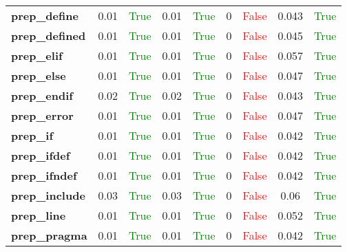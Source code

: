 \documentclass{article}
\begin{document}
\begin{xltabular}{\textwidth}{lcccccccc}
\textbf{{\fontsize{10}{12}\selectfont prep\_define}}& 0.01&\textcolor{green}{True}& 0.01&\textcolor{green}{True}& 0&\textcolor{red}{False}& 0.043&\textcolor{green}{True} \\[0.5ex]
\textbf{{\fontsize{10}{12}\selectfont prep\_defined}}& 0.01&\textcolor{green}{True}& 0.01&\textcolor{green}{True}& 0&\textcolor{red}{False}& 0.045&\textcolor{green}{True} \\[0.5ex]
\textbf{{\fontsize{10}{12}\selectfont prep\_elif}}& 0.01&\textcolor{green}{True}& 0.01&\textcolor{green}{True}& 0&\textcolor{red}{False}& 0.057&\textcolor{green}{True} \\[0.5ex]
\textbf{{\fontsize{10}{12}\selectfont prep\_else}}& 0.01&\textcolor{green}{True}& 0.01&\textcolor{green}{True}& 0&\textcolor{red}{False}& 0.047&\textcolor{green}{True} \\[0.5ex]
\textbf{{\fontsize{10}{12}\selectfont prep\_endif}}& 0.02&\textcolor{green}{True}& 0.02&\textcolor{green}{True}& 0&\textcolor{red}{False}& 0.043&\textcolor{green}{True} \\[0.5ex]
\textbf{{\fontsize{10}{12}\selectfont prep\_error}}& 0.01&\textcolor{green}{True}& 0.01&\textcolor{green}{True}& 0&\textcolor{red}{False}& 0.047&\textcolor{green}{True} \\[0.5ex]
\textbf{{\fontsize{10}{12}\selectfont prep\_if}}& 0.01&\textcolor{green}{True}& 0.01&\textcolor{green}{True}& 0&\textcolor{red}{False}& 0.042&\textcolor{green}{True} \\[0.5ex]
\textbf{{\fontsize{10}{12}\selectfont prep\_ifdef}}& 0.01&\textcolor{green}{True}& 0.01&\textcolor{green}{True}& 0&\textcolor{red}{False}& 0.042&\textcolor{green}{True} \\[0.5ex]
\textbf{{\fontsize{10}{12}\selectfont prep\_ifndef}}& 0.01&\textcolor{green}{True}& 0.01&\textcolor{green}{True}& 0&\textcolor{red}{False}& 0.042&\textcolor{green}{True} \\[0.5ex]
\textbf{{\fontsize{10}{12}\selectfont prep\_include}}& 0.03&\textcolor{green}{True}& 0.03&\textcolor{green}{True}& 0&\textcolor{red}{False}& 0.06&\textcolor{green}{True} \\[0.5ex]
\textbf{{\fontsize{10}{12}\selectfont prep\_line}}& 0.01&\textcolor{green}{True}& 0.01&\textcolor{green}{True}& 0&\textcolor{red}{False}& 0.052&\textcolor{green}{True} \\[0.5ex]
\textbf{{\fontsize{10}{12}\selectfont prep\_pragma}}& 0.01&\textcolor{green}{True}& 0.01&\textcolor{green}{True}& 0&\textcolor{red}{False}& 0.042&\textcolor{green}{True} \\[0.5ex]

\end{xltabular}
\end{document}

